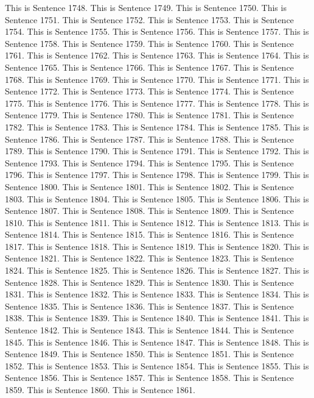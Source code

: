 \documentclass{article}
\begin{document}
This is Sentence 1748.
This is Sentence 1749.
This is Sentence 1750.
This is Sentence 1751.
This is Sentence 1752.
This is Sentence 1753.
This is Sentence 1754.
This is Sentence 1755.
This is Sentence 1756.
This is Sentence 1757.
This is Sentence 1758.
This is Sentence 1759.
This is Sentence 1760.
This is Sentence 1761.
This is Sentence 1762.
This is Sentence 1763.
This is Sentence 1764.
This is Sentence 1765.
This is Sentence 1766.
This is Sentence 1767.
This is Sentence 1768.
This is Sentence 1769.
This is Sentence 1770.
This is Sentence 1771.
This is Sentence 1772.
This is Sentence 1773.
This is Sentence 1774.
This is Sentence 1775.
This is Sentence 1776.
This is Sentence 1777.
This is Sentence 1778.
This is Sentence 1779.
This is Sentence 1780.
This is Sentence 1781.
This is Sentence 1782.
This is Sentence 1783.
This is Sentence 1784.
This is Sentence 1785.
This is Sentence 1786.
This is Sentence 1787.
This is Sentence 1788.
This is Sentence 1789.
This is Sentence 1790.
This is Sentence 1791.
This is Sentence 1792.
This is Sentence 1793.
This is Sentence 1794.
This is Sentence 1795.
This is Sentence 1796.
This is Sentence 1797.
This is Sentence 1798.
This is Sentence 1799.
This is Sentence 1800.
This is Sentence 1801.
This is Sentence 1802.
This is Sentence 1803.
This is Sentence 1804.
This is Sentence 1805.
This is Sentence 1806.
This is Sentence 1807.
This is Sentence 1808.
This is Sentence 1809.
This is Sentence 1810.
This is Sentence 1811.
This is Sentence 1812.
This is Sentence 1813.
This is Sentence 1814.
This is Sentence 1815.
This is Sentence 1816.
This is Sentence 1817.
This is Sentence 1818.
This is Sentence 1819.
This is Sentence 1820.
This is Sentence 1821.
This is Sentence 1822.
This is Sentence 1823.
This is Sentence 1824.
This is Sentence 1825.
This is Sentence 1826.
This is Sentence 1827.
This is Sentence 1828.
This is Sentence 1829.
This is Sentence 1830.
This is Sentence 1831.
This is Sentence 1832.
This is Sentence 1833.
This is Sentence 1834.
This is Sentence 1835.
This is Sentence 1836.
This is Sentence 1837.
This is Sentence 1838.
This is Sentence 1839.
This is Sentence 1840.
This is Sentence 1841.
This is Sentence 1842.
This is Sentence 1843.
This is Sentence 1844.
This is Sentence 1845.
This is Sentence 1846.
This is Sentence 1847.
This is Sentence 1848.
This is Sentence 1849.
This is Sentence 1850.
This is Sentence 1851.
This is Sentence 1852.
This is Sentence 1853.
This is Sentence 1854.
This is Sentence 1855.
This is Sentence 1856.
This is Sentence 1857.
This is Sentence 1858.
This is Sentence 1859.
This is Sentence 1860.
This is Sentence 1861.
\end{document}
